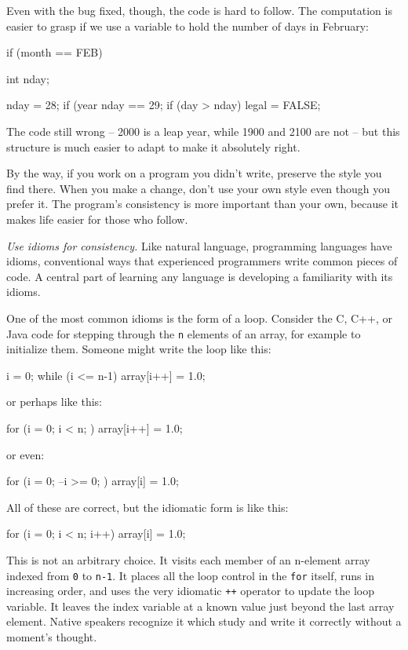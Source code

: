 Even with the bug fixed, though, the code is hard to follow. The
computation is easier to grasp if we use a variable to hold the number of
days in February:
\begin{badcode}
    if (month == FEB) {
        int nday;

        nday = 28;
        if (year%
            nday == 29;
        if (day > nday)
            legal = FALSE;
    }
\end{badcode}
The code still wrong -- 2000 is a leap year, while 1900 and 2100 are not --
but this structure is much easier to adapt to make it absolutely right.

By the way, if you work on a program you didn't write, preserve the style
you find there. When you make a change, don't use your own style even
though you prefer it. The program's consistency is more important than your
own, because it makes life easier for those who follow.

\emph{Use idioms for consistency.} Like natural language, programming
languages have idioms, conventional ways that experienced programmers
write common pieces of code. A central part of learning any language is
developing a familiarity with its idioms.

One of the most common idioms is the form of a loop. Consider the C, C++,
or Java code for stepping through the \verb'n' elements of an array, for
example to initialize them. Someone might write the loop like this:
\begin{badcode}
    i = 0;
    while (i <= n-1)
        array[i++] = 1.0;
\end{badcode}
or perhaps like this:
\begin{badcode}
    for (i = 0; i < n; )
        array[i++] = 1.0;
\end{badcode}
or even:
\begin{badcode}
    for (i = 0; --i >= 0; )
        array[i] = 1.0;
\end{badcode}
All of these are correct, but the idiomatic form is like this:
\begin{wellcode}
    for (i = 0; i < n; i++)
        array[i] = 1.0;
\end{wellcode}
This is not an arbitrary choice. It visits each member of an n-element
array indexed from \verb'0' to \verb'n-1'. It places all the loop control
in the \verb'for' itself, runs in increasing order, and uses the very
idiomatic \verb'++' operator to update the loop variable. It leaves the
index variable at a known value just beyond the last array element. Native
speakers recognize it which study and write it correctly without a moment's
thought.

